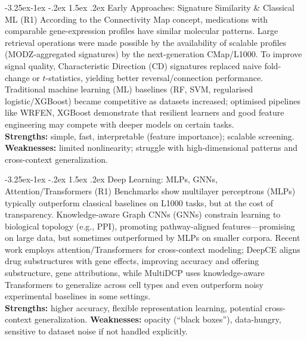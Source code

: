 \documentclass[12pt,a4paper]{article}
\makeatletter
\renewcommand\subsection{\@startsection{subsection}{2}{\z@}%
  {-3.25ex\@plus-1ex \@minus-.2ex}%
  {1.5ex \@plus.2ex}%
  {\normalfont\normalsize\bfseries}}
\makeatother
\begin{document}
\subsection{Early Approaches: Signature Similarity \& Classical ML (R1)}
According to the Connectivity Map concept, medications with comparable gene-expression profiles have similar molecular patterns.  Large retrieval operations were made possible by the availability of scalable profiles (MODZ-aggregated signatures) by the next-generation CMap/L1000\cite{subramanian2017next}. To improve signal quality, Characteristic Direction (CD) signatures replaced naive fold-change or $t$-statistics, yielding better reversal/connection performance\cite{duan2016l1000cds2}. Traditional machine learning (ML) baselines (RF, SVM, regularised logistic/XGBoost) became competitive as datasets increased; optimised pipelines like WRFEN, XGBoost demonstrate that resilient learners and good feature engineering may compete with deeper models on certain tasks\cite{lu2021drug}.\\
\textbf{Strengths:} simple, fast, interpretable (feature importance); scalable screening.
\textbf{Weaknesses:} limited nonlinearity; struggle with high-dimensional patterns and cross-context generalization.

\subsection{Deep Learning: MLPs, GNNs, Attention/Transformers (R1)}
Benchmarks show multilayer perceptrons (MLPs) typically outperform classical baselines on L1000 tasks, but at the cost of transparency\cite{mcdermott2019deep}. Knowledge-aware Graph CNNs (GNNs) constrain learning to biological topology (e.g., PPI), promoting pathway-aligned features—promising on large data, but sometimes outperformed by MLPs on smaller corpora\cite{mcdermott2019deep}. Recent work employs attention/Transformers for cross-context modeling; DeepCE aligns drug substructures with gene effects, improving accuracy and offering substructure, gene attributions\cite{pham2021deep}, while MultiDCP uses knowledge-aware Transformers to generalize across cell types and even outperform noisy experimental baselines in some settings\cite{wu2022deep}.\\
\textbf{Strengths:} higher accuracy, flexible representation learning, potential cross-context generalization.
\textbf{Weaknesses:} opacity (\enquote{black boxes}), data-hungry, sensitive to dataset noise if not handled explicitly.
\end{document}
